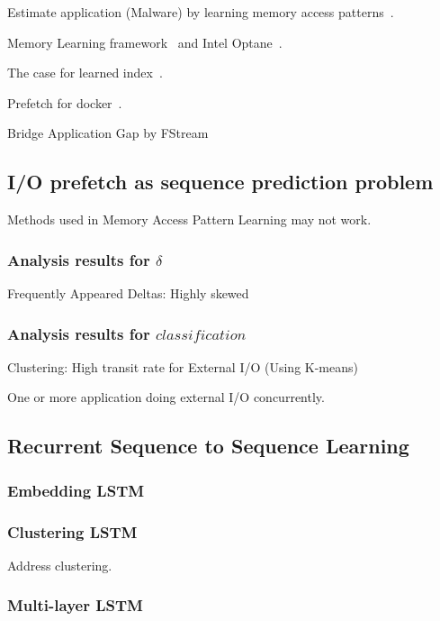 Estimate application (Malware) by learning memory access patterns~\cite{xu2017malware}.

Memory Learning framework~\cite{deng2017memory} and Intel Optane~\cite{elie2018intel}.

The case for learned index~\cite{kraska2018case}.

Prefetch for docker~\cite{anwar2018improving}.

Bridge Application Gap by FStream~\cite{rho2018fstream}


\subsection{I/O prefetch as sequence prediction problem}

Methods used in Memory Access Pattern Learning may not work.

\subsubsection{Analysis results for $\delta$}

Frequently Appeared Deltas: Highly skewed

\subsubsection{Analysis results for $classification$}

Clustering: High transit rate for External I/O (Using K-means)

One or more application doing external I/O concurrently.

\subsection{Recurrent Sequence to Sequence Learning}

\subsubsection{Embedding LSTM}

\subsubsection{Clustering LSTM}

Address clustering.

\subsubsection{Multi-layer LSTM}


